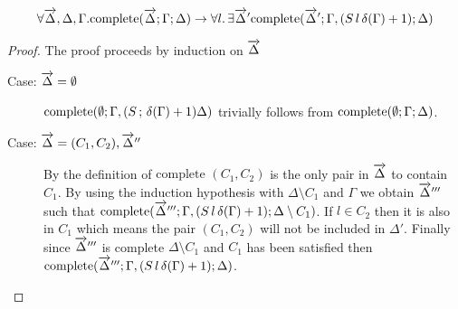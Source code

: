 \begin{mylemma}
\begin{align*}\forall \overrightarrow{\Delta},\Delta,\Gamma.  \mathrm{complete}(\overrightarrow{\Delta};\Gamma; \Delta) \to \forall l. \, \exists \overrightarrow{\Delta}' \mathrm{complete}(\overrightarrow{\Delta}';\Gamma, (S \, l \, \delta(\Gamma) + 1); \Delta)
\end{align*}
\begin{proof}
The proof proceeds by induction on $\overrightarrow{\Delta}$
\begin{description}
\item[Case: $\overrightarrow{\Delta} = \emptyset$] 
$\mathrm{complete}(\emptyset;\Gamma, (S \, ; \, \delta(\Gamma) + 1) \Delta)$ trivially follows from $\mathrm{complete}(\emptyset;\Gamma; \Delta)$.
\item[Case: $\overrightarrow{\Delta} = (C_1,C_2),\overrightarrow{\Delta}''$]
By the definition of $\mathrm{complete}$ $(C_1, C_2)$ is the only pair in $\overrightarrow{\Delta}$ to contain $C_1$.  By using the induction hypothesis with $\Delta \setminus C_1$ and $\Gamma$ we obtain $\overrightarrow{\Delta}'''$ such that $\mathrm{complete}(\overrightarrow{\Delta}''';\Gamma, (S \, l \, \delta(\Gamma) + 1); \Delta \setminus C_1)$.  If $l \in C_2$ then it is also in $C_1$ which means the pair $(C_1, C_2)$ will not be included in $\Delta'$. Finally since $\overrightarrow{\Delta}'''$ is complete $\Delta \setminus C_1$ and $C_1$ has been satisfied then $\mathrm{complete}(\overrightarrow{\Delta}''';\Gamma, (S \, l \, \delta(\Gamma) + 1); \Delta)$.

\end{description}
\end{proof}

\end{mylemma}

